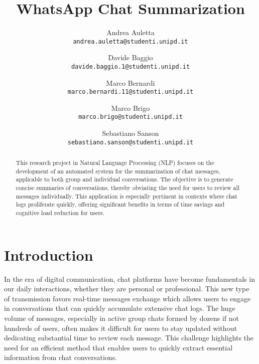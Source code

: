 \documentclass[10pt,twocolumn,letterpaper]{article}
\begin{document}
\title{WhatsApp Chat Summarization}

\author{Andrea Auletta\\
{\tt\small andrea.auletta@studenti.unipd.it}
\and
Davide Baggio\\
{\tt\small davide.baggio.1@studenti.unipd.it}
\and
Marco Bernardi\\
{\tt\small marco.bernardi.11@studenti.unipd.it}
\and
Marco Brigo\\
{\tt\small marco.brigo@studenti.unipd.it}
\and
Sebastiano Sanson\\
{\tt\small sebastiano.sanson@studenti.unipd.it}
}

\maketitle

\begin{abstract}This research project in Natural Language Processing (NLP) 
   focuses on the development of an automated system for the summarization 
   of chat messages, applicable to both group and individual conversations. The objective is to generate concise summaries of conversations, 
   thereby obviating the need for users to review all messages individually. 
   This application is especially pertinent in contexts where chat logs proliferate quickly, 
   offering significant benefits in terms of time savings and cognitive load reduction for users.
\end{abstract}

\section{Introduction}

In the era of digital communication, chat platforms have become fundamentals in our daily interactions, whether they are personal or professional. This new type of transmission favors real-time messages exchange which allows users to engage in conversations that can quickly accumulate extensive chat logs. The huge volume of messages, especially in active group chats formed by dozens if not hundreds of users, often makes it difficult for users to stay updated without dedicating substantial time to review each message. This challenge highlights the need for an efficient method that enables users to quickly extract essential information from chat conversations.
\end{document}

